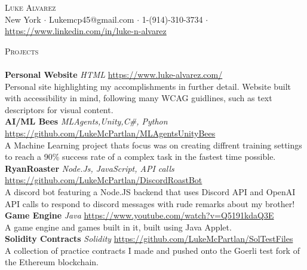 \documentclass[a4paper]{article}
\newcommand{\lineunder} {
    \vspace*{-8pt} \\
    \hspace*{-18pt} \hrulefill \\
}
\newcommand{\header} [1] {
    {\hspace*{-18pt}\vspace*{6pt} \textsc{#1}}
    \vspace*{-6pt} \lineunder
}
\begin{document}
\vspace*{-40pt}

    

\vspace*{-10pt}
\begin{center}
	{\Huge \scshape {Luke Alvarez}}\\
	New York $\cdot$ Lukemcp45@gmail.com $\cdot$ 1-(914)-310-3734 $\cdot$ 
\href{https://www.linkedin.com/in/luke-n-alvarez}{https://www.linkedin.com/in/luke-n-alvarez} \\
\end{center}

\header{Projects}
{\textbf{Personal Website }}{\sl  HTML} \hfill \href{https://sites.google.com/view/luke-alvarez/home}{https://www.luke-alvarez.com/}\\
Personal site highlighting my accomplishments in further detail. Website built with accessibility in mind, following many WCAG guidlines, such as text descriptors for visual content.\\
\vspace*{2mm}
{\textbf{AI/ML Bees}} {\sl MLAgents,Unity,C\#, Python} \hfill
\href{https://github.com/LukeMcPartlan/MLAgentsUnityBees}{https://github.com/LukeMcPartlan/MLAgentsUnityBees}\\
A Machine Learning project thats focus was on creating diffrent training settings to reach a 90\% success rate of a complex task in the fastest time possible.\\
\vspace*{2mm}
{\textbf{RyanRoaster}} {\sl Node.Js, JavaScript, API calls} \hfill
\href{https://github.com/LukeMcPartlan/DiscordRoastBot}{https://github.com/LukeMcPartlan/DiscordRoastBot}\\
A discord bot featuring a Node.JS backend that uses Discord API and OpenAI API calls to respond to discord messages with rude remarks about my brother!\\
\vspace*{2mm}
{\textbf{Game Engine}} {\sl Java} \hfill \href{https://www.youtube.com/watch?v=Q5191kdaQ3E}{https://www.youtube.com/watch?v=Q5191kdaQ3E}\\
A game engine and games built in it, built using Java Applet.\\
\vspace*{2mm}
{\textbf{Solidity Contracts}} {\sl Solidity} \hfill \href{https://github.com/LukeMcPartlan/SolTestFiles}{https://github.com/LukeMcPartlan/SolTestFiles}\\
A collection of practice contracts I made and pushed onto the Goerli test fork of the Ethereum blockchain.\\
\vspace*{2mm}
\end{document}
